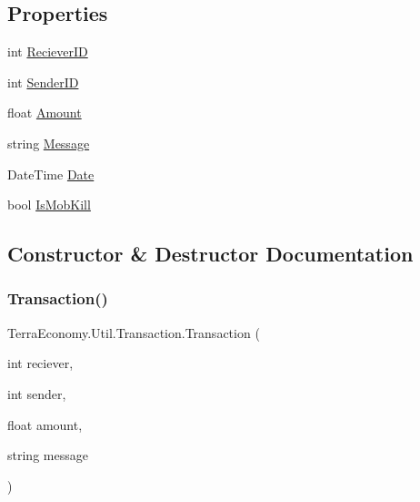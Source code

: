 \subsection*{Properties}
\begin{DoxyCompactItemize}
\item 
int \hyperlink{class_terra_economy_1_1_util_1_1_transaction_aa2c855a182abe665d24d9139cf5df0de}{Reciever\+ID}
\item 
int \hyperlink{class_terra_economy_1_1_util_1_1_transaction_aab52d5fce62fb06777b6bed61f789e62}{Sender\+ID}
\item 
float \hyperlink{class_terra_economy_1_1_util_1_1_transaction_a442514eb597af07f0390c24944c0363c}{Amount}
\item 
string \hyperlink{class_terra_economy_1_1_util_1_1_transaction_ad1bebe07be58a5962ffeae0a9e67df07}{Message}
\item 
Date\+Time \hyperlink{class_terra_economy_1_1_util_1_1_transaction_a8c779baf7a95ca43350d7ed8aef37b0f}{Date}
\item 
bool \hyperlink{class_terra_economy_1_1_util_1_1_transaction_af204e13eaada208911cfd42d808aaf64}{Is\+Mob\+Kill}
\end{DoxyCompactItemize}


\subsection{Constructor \& Destructor Documentation}
\mbox{\label{class_terra_economy_1_1_util_1_1_transaction_a644f5d52bf8420bdd5b1ca7f829a2321}} 
\subsubsection{\texorpdfstring{Transaction()}{Transaction()}\hspace{0.1cm}{\footnotesize\ttfamily [1/2]}}
{\footnotesize\ttfamily Terra\+Economy.\+Util.\+Transaction.\+Transaction (\begin{DoxyParamCaption}\item[{int}]{reciever,  }\item[{int}]{sender,  }\item[{float}]{amount,  }\item[{string}]{message }\end{DoxyParamCaption})\hspace{0.3cm}{\ttfamily [inline]}}

